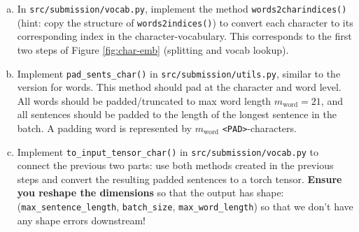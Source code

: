 \begin{enumerate}[(a)]
    \item {} In \texttt{src/submission/vocab.py}, implement the method \texttt{words2charindices()} (hint: copy the structure of \texttt{words2indices()}) to convert each character to its corresponding index in the character-vocabulary. This corresponds to the first two steps of Figure \ref{fig:char-emb} (splitting and vocab lookup).

    \item {} Implement \texttt{pad\_sents\_char()} in \texttt{src/submission/utils.py}, similar to the version for words. This method should pad at the character and word level. 
    All words should be padded/truncated to max word length $m_\text{word}=21$, and all sentences should be padded to the length of the longest sentence in the batch.
    A padding word is represented by $m_\text{word}$ \texttt{<PAD>}-characters.

    \item {} Implement \texttt{to\_input\_tensor\_char()} in \texttt{src/submission/vocab.py} to connect the previous two parts: use both methods created in the previous steps and convert the resulting padded sentences to a torch tensor. \textbf{Ensure you reshape the dimensions} so that the output has shape: (\texttt{max\_sentence\_length}, \texttt{batch\_size}, \texttt{max\_word\_length}) so that we don't have any shape errors downstream! 


\end{enumerate}
